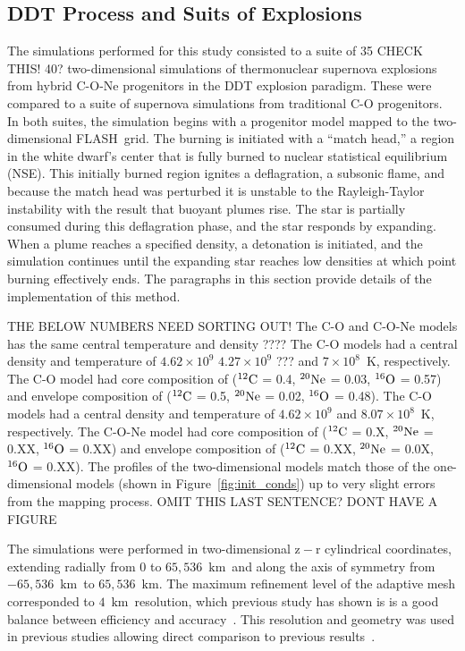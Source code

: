 \documentclass[iop,apj]{emulateapj}
\newcommand{\figref}[1]{Figure~\ref{#1}}
\newcommand{\C}[1]{\ensuremath{{}^{#1}{\rm C}}}
\newcommand{\Ox}[1]{\ensuremath{{}^{#1}{\rm O}}}
\newcommand{\Ne}[1]{\ensuremath{{}^{#1}{\rm Ne}}}
\newcommand{\code}[1]{\textsc{#1}}
\newcommand{\FLASH}{\code{FLASH}}
\newcommand{\unitstyle}[1]{\ensuremath{\mathrm{#1}}}
\newcommand{\kilo}{\unitstyle{k}}
\newcommand{\meter}{\unitstyle{m}}
\newcommand{\km}{\kilo\meter}   %
\begin{document}
\subsection{DDT Process and Suits of Explosions}

The simulations performed for this study consisted to a suite of
{\color{red} 35 CHECK THIS! 40?} two-dimensional simulations of 
thermonuclear supernova
explosions from hybrid C-O-Ne progenitors in the DDT explosion paradigm. These 
were compared to a suite of supernova simulations from traditional
C-O progenitors. In both suites, the simulation
begins with a progenitor model mapped to the two-dimensional 
\FLASH\ grid. The burning is initiated with a ``match head,'' a region 
in the white dwarf's center that is fully burned to nuclear statistical
equilibrium (NSE). 
This initially burned region ignites a deflagration, a subsonic
flame, and because the match head was perturbed it is unstable to
the Rayleigh-Taylor instability with the result that buoyant plumes 
rise. The star is partially consumed during this deflagration phase,
and the star responds by expanding.
When a plume reaches a specified density,
a detonation is initiated, and the simulation continues until 
the expanding star reaches low densities at which point burning
effectively ends. The paragraphs in this section provide details
of the implementation of this method.


{\color{red} THE BELOW NUMBERS NEED SORTING OUT!}
The C-O and C-O-Ne models has the same central temperature
and density ????
The C-O models had a central density and 
temperature of $4.62 \times 10^{9}$ $4.27 \times 10^{9}$ ???
and $7 \times 10^8$~K, respectively.
The C-O model had core composition of (\C{12} = 0.4, 
\Ne{20} = 0.03, \Ox{16} = 0.57) and envelope composition 
of (\C{12} = 0.5, \Ne{20} = 0.02, \Ox{16} = 0.48). 
The C-O models had a central density and 
temperature of $4.62 \times 10^{9}$ 
and $8.07 \times 10^8$~K, respectively.
The C-O-Ne model had core composition of (\C{12} = 0.X, 
\Ne{20} = 0.XX, \Ox{16} = 0.XX) and envelope composition 
of (\C{12} = 0.XX, \Ne{20} = 0.0X, \Ox{16} = 0.XX). 
The profiles of the two-dimensional models match those of
the one-dimensional models (shown in \figref{fig:init_conds})
up to very slight errors from the mapping process. {\color{red}
OMIT THIS LAST SENTENCE? DONT HAVE A FIGURE}

The simulations were performed in two-dimensional $\mathrm{z-r}$
cylindrical coordinates, extending radially from 0 to
$65,536$~\km\ and along the axis of symmetry from $-65,536$~\km\ to
$65,536$~\km. The maximum refinement level of the adaptive mesh 
corresponded to $4$~\km\ resolution, which previous study has shown is
is a good balance between efficiency and 
accuracy~\citep{townsley.calder.ea:flame,townetal2009}.
This resolution and geometry was used in previous studies
allowing direct comparison to previous results~\citep{kruegetal12}.
\end{document}

